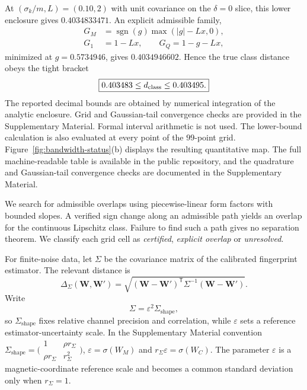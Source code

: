 \documentclass[12pt]{iopjournal}
\theoremstyle{definition}
\theoremstyle{remark}
\begin{document}
At $(\sigma_k/m,L)=(0.10,2)$ with unit covariance on the $\delta=0$ slice, this lower enclosure gives $0.4034833471$. An explicit admissible family,
\begin{equation}
\begin{aligned}
G_M&=\operatorname{sgn}(g)\max(|g|-Lx,0),\\
G_1&=1-Lx,\qquad G_Q=1-g-Lx,
\end{aligned}
\label{eq:explicit-distance-upper-profile}
\end{equation}
minimized at $g=0.5734946$, gives $0.4034946602$. Hence the true class distance obeys the tight bracket
\begin{equation}
\boxed{0.403483\le d_{\rm class}\le0.403495.}
\label{eq:reference-distance-bracket}
\end{equation}
The reported decimal bounds are obtained by numerical integration of the analytic enclosure. Grid and Gaussian-tail convergence checks are provided in the Supplementary Material. Formal interval arithmetic is not used. The lower-bound calculation is also evaluated at every point of the $99$-point grid. Figure~\ref{fig:bandwidth-status}(b) displays the resulting quantitative map. The full machine-readable table is available in the public repository, and the quadrature and Gaussian-tail convergence checks are documented in the Supplementary Material.

We search for admissible overlaps using piecewise-linear form factors with bounded slopes. A verified sign change along an admissible path yields an overlap for the continuous Lipschitz class. Failure to find such a path gives no separation theorem. We classify each grid cell as \emph{certified}, \emph{explicit overlap} or \emph{unresolved}.

For finite-noise data, let $\Sigma$ be the covariance matrix of the calibrated fingerprint estimator. The relevant distance is
\begin{equation}
\Delta_\Sigma(\bm W,\bm W')=
\sqrt{(\bm W-\bm W')^{\mathsf T}\Sigma^{-1}(\bm W-\bm W')}.
\label{eq:mahalanobis}
\end{equation}
Write
\begin{equation}
\Sigma=\varepsilon^2\Sigma_{\mathrm{shape}},
\end{equation}
so $\Sigma_{\mathrm{shape}}$ fixes relative channel precision and correlation, while $\varepsilon$ sets a reference estimator-uncertainty scale. In the Supplementary Material convention $\Sigma_{\mathrm{shape}}=\bigl(\begin{smallmatrix}1&\rho r_\Sigma\\ \rho r_\Sigma&r_\Sigma^2\end{smallmatrix}\bigr)$, $\varepsilon=\sigma(W_M)$ and $r_\Sigma\varepsilon=\sigma(W_C)$. The parameter $\varepsilon$ is a magnetic-coordinate reference scale and becomes a common standard deviation only when $r_\Sigma=1$.
\end{document}
